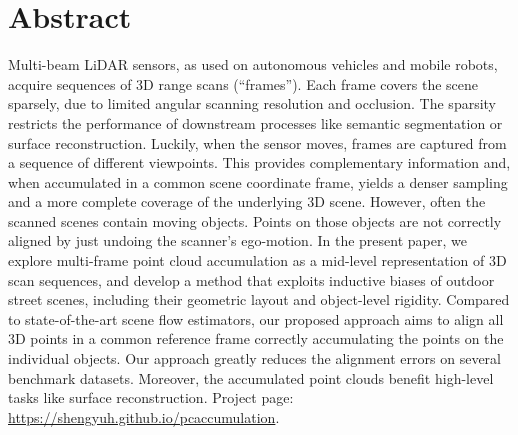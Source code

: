 \section*{Abstract}
Multi-beam LiDAR sensors, as used on autonomous vehicles and mobile robots, acquire sequences of 3D range scans (``frames''). Each frame covers the scene sparsely, due to limited angular scanning resolution and occlusion. The sparsity restricts the performance of downstream processes like semantic segmentation or surface reconstruction. Luckily, when the sensor moves, frames are captured from a sequence of different viewpoints. This provides complementary information and, when accumulated in a common scene coordinate frame, yields a denser sampling and a more complete coverage of the underlying 3D scene. However, often the scanned scenes contain moving objects. Points on those objects are not correctly aligned by just undoing the scanner's ego-motion. In the present paper, we explore multi-frame point cloud accumulation as a mid-level representation of 3D scan sequences, and develop a method that exploits inductive biases of outdoor street scenes, including their geometric layout and object-level rigidity. Compared to state-of-the-art scene flow estimators, our proposed approach aims to align all 3D points in a common reference frame correctly accumulating the points on the individual objects. Our approach greatly reduces the alignment errors on several benchmark datasets. Moreover, the accumulated point clouds benefit high-level tasks like surface reconstruction. Project page: \url{https://shengyuh.github.io/pcaccumulation}.